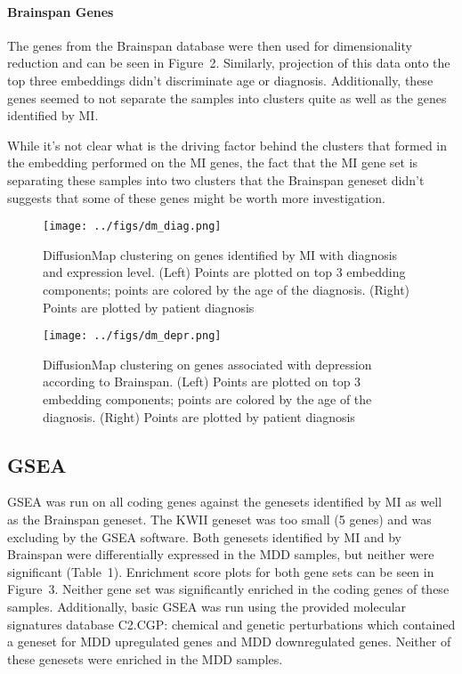 \documentclass{bioinfo}
\begin{document}
\paragraph{Brainspan Genes} The genes from the Brainspan database were then used for dimensionality reduction and can be seen in Figure~2\vphantom{\ref{fig:02}}.  Similarly, projection of this data onto the top three embeddings didn't discriminate age or diagnosis.  Additionally, these genes seemed to not separate the samples into clusters quite as well as the genes identified by MI.

While it's not clear what is the driving factor behind the clusters that formed in the embedding performed on the MI genes, the fact that the MI gene set is separating these samples into two clusters that the Brainspan geneset didn't suggests that some of these genes might be worth more investigation.
\begin{figure*}[tbp!]%
    \centering
    \texttt{[image: ../figs/dm\_diag.png]}
        \caption{DiffusionMap clustering on genes identified by MI with diagnosis and expression level.  (Left) Points are plotted on top 3 embedding components; points are colored by the age of the diagnosis. (Right) Points are plotted by patient diagnosis}\label{fig:01}
    \end{figure*}
\begin{figure*}[tbp!]%
    \centering
    \texttt{[image: ../figs/dm\_depr.png]}
    \caption{DiffusionMap clustering on genes associated with depression according to Brainspan.  (Left) Points are plotted on top 3 embedding components; points are colored by the age of the diagnosis. (Right) Points are plotted by patient diagnosis}\label{fig:02}
\end{figure*}
\clearpage
\subsection{GSEA}
GSEA was run on all coding genes against the genesets identified by MI as well as the Brainspan geneset.  The KWII geneset was too small (5 genes) and was excluding by the GSEA software.  Both genesets identified by MI and by Brainspan were differentially expressed in the MDD samples, but neither were significant (Table~1\vphantom{\ref{Tab:01}}).  Enrichment score plots for both gene sets can be seen in Figure~3\vphantom{\ref{fig:03}}.  Neither gene
set was significantly enriched in the coding genes of these samples.  Additionally, basic GSEA was run using the provided molecular signatures database C2.CGP: chemical and genetic perturbations which contained a geneset for MDD upregulated genes and MDD downregulated genes.  Neither of these genesets were enriched in the MDD samples.
\end{document}
